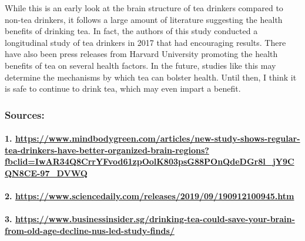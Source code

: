 \documentclass[]{article}
\let\oldparagraph\paragraph
\renewcommand{\paragraph}[1]{\oldparagraph{#1}\mbox{}}
\begin{document}
While this is an early look at the brain structure of tea drinkers
compared to non-tea drinkers, it follows a large amount of literature
suggesting the health benefits of drinking tea. In fact, the authors of
this study conducted a longitudinal study of tea drinkers in 2017 that
had encouraging results. There have also been press releases from
Harvard University promoting the health benefits of tea on several
health factors. In the future, studies like this may determine the
mechanisms by which tea can bolster health. Until then, I think it is
safe to continue to drink tea, which may even impart a benefit.

\hypertarget{sources}{%
\subsubsection{Sources:}\label{sources}}

\hypertarget{httpswww.mindbodygreen.comarticlesnew-study-shows-regular-tea-drinkers-have-better-organized-brain-regionsfbclidiwar34q8crryfvod61zpoolk803psg88ponqdedgr8l_jy9cqn8ce-97_dvwq}{%
\paragraph{\texorpdfstring{1.
\url{https://www.mindbodygreen.com/articles/new-study-shows-regular-tea-drinkers-have-better-organized-brain-regions?fbclid=IwAR34Q8CrrYFvod61zpOolK803psG88POnQdeDGr8l_jY9CQN8CE-97_DVWQ}}{1. https://www.mindbodygreen.com/articles/new-study-shows-regular-tea-drinkers-have-better-organized-brain-regions?fbclid=IwAR34Q8CrrYFvod61zpOolK803psG88POnQdeDGr8l\_jY9CQN8CE-97\_DVWQ}}\label{httpswww.mindbodygreen.comarticlesnew-study-shows-regular-tea-drinkers-have-better-organized-brain-regionsfbclidiwar34q8crryfvod61zpoolk803psg88ponqdedgr8l_jy9cqn8ce-97_dvwq}}

\hypertarget{httpswww.sciencedaily.comreleases201909190912100945.htm}{%
\paragraph{\texorpdfstring{2.
\url{https://www.sciencedaily.com/releases/2019/09/190912100945.htm}}{2. https://www.sciencedaily.com/releases/2019/09/190912100945.htm}}\label{httpswww.sciencedaily.comreleases201909190912100945.htm}}

\hypertarget{httpswww.businessinsider.sgdrinking-tea-could-save-your-brain-from-old-age-decline-nus-led-study-finds}{%
\paragraph{\texorpdfstring{3.
\url{https://www.businessinsider.sg/drinking-tea-could-save-your-brain-from-old-age-decline-nus-led-study-finds/}}{3. https://www.businessinsider.sg/drinking-tea-could-save-your-brain-from-old-age-decline-nus-led-study-finds/}}\label{httpswww.businessinsider.sgdrinking-tea-could-save-your-brain-from-old-age-decline-nus-led-study-finds}}
\end{document}
